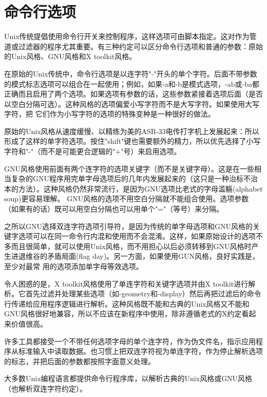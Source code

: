 \documentclass[12pt,oneside]{book}
\begin{document}
\section{命令行选项}
Unix传统提倡使用命令行开关来控制程序，这样选项可由脚本指定。这对作为管道或过滤器的程序尤其重要。有三种约定可以区分命令行选项和普通的参数：原始的Unix风格、GNU风格和X toolkit风格。

在原始的Unix传统中，命令行选项是以连字符"-"开头的单个字符。后面不带参数的模式标志选项可以组合在一起使用；例如，如果-a和-b是模式选项，-ab或-ba都正确而且启用了两个选项。如果选项有参数的话，这些参数紧接着选项后面（是否以空白分隔可选）。这种风格的选项偏爱小写字符而不是大写字符。如果使用大写字符，把
它们作为小写字符的选项的特殊变种是一种很好的做法。

原始的Unix风格从速度缓慢、以精练为美的ASR-33电传打字机上发展起来：所以形成了这样的单字符选项。按住"shift"键也需要额外的精力，所以优先选择了小写字符和"-"（而不是可能更合逻辑的"+"号）来启用选项。

GNU风格使用前面有两个连字符的选项关键字（而不是关键字母）。这是在一些相当复杂的GNU程序用完单字母选项后的几年内发展起来的（这只是一种治标不治本的方法）。这种风格仍然非常流行，是因为GNU选项比老式的字母滥觞(alphabet soup)更容易理解。 GNU风格的选项不用空白分隔就不能组合使用。选项参数（如果有的话）既可以用空白分隔也可以用单个"="（等号）来分隔。

之所以GNU选择双连字符选项引导符，是因为传统的单字母选项和GNU风格的关键字选项可以在同一命令行内混和使用而不会混淆。这样，如果原始设计的选项不多而且很简单，就可以使用Unix风格，而不用担心以后必须转移到GNU风格时产生进退维谷的矛盾局面(flag day)。另一方面，如果使用GUN风格，良好实践是，至少对最常
用的选项添加单字母等效选项。

令人困惑的是，X toolkit风格使用了单连字符和关键字选项并由X toolkit进行解析。它首先过滤并处理某些选项（如-geometry和-display）然后再把过滤后的命令行传递给应用程序逻辑进行解析。这种风格既不能和古典的Unix风格又不能和GNU风格很好地兼容，所以不应该在新程序中使用，除非遵循老式的X约定看起来价值很高。

许多工具都接受一个不带任何选项字母的单个连字符，作为伪文件名，指示应用程序从标准输入中读取数据。也习惯上把双连字符视为单连字符，作为停止解析选项的标志，并把后面的参数都按照字面意义处理。

大多数Unix编程语言都提供命令行程序库，以解析古典的Unix风格或GNU风格（也解析双连字符约定）。
\end{document}
